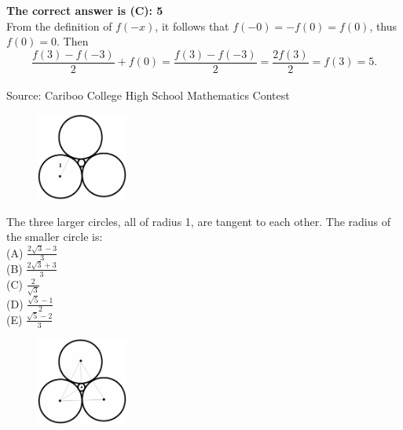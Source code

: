\documentclass{article}
\begin{document}

\textbf{The correct answer is (C): 5}\\[1 ex]
From the definition of $f(-x)$, it follows that $f(-0)=-f(0)=f(0)$, thus $f(0)=0$. Then
\begin{equation*}
\frac{f(3)-f(-3)}{2}+f(0)=\frac{f(3)-f(-3)}{2}=\frac{2f(3)}{2}=f(3)=5.
\end{equation*}
\\[5 ex]

\scriptsize
Source: Cariboo College High School Mathematics Contest

\normalsize
\begin{figure}
	\includegraphics[width=30mm,viewport=106 49 515 440]{CCSPR74-18pic.eps}
\end{figure}
The three larger circles, all of radius 1, are tangent to each other. The radius of the smaller circle is:\\
(A) $\frac{2\sqrt{3}-3}{3}$\\[1 ex]
(B) $\frac{2\sqrt{3}+3}{3}$\\[1 ex]
(C) $\frac{2}{\sqrt{3}}$\\[1 ex]
(D) $\frac{\sqrt{5}-1}{2}$\\[1 ex]
(E) $\frac{\sqrt{5}-2}{3}$\\

\begin{figure}
	\includegraphics[width=30mm,viewport=106 49 515 440]{CCSPR74-18pic2.eps}
\end{figure}
\end{document}
